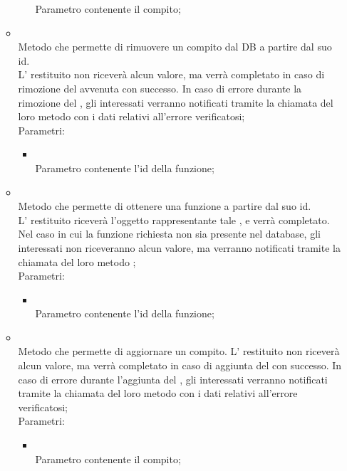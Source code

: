 \begin{itemize}
\begin{itemize}
\begin{itemize}
			Parametro contenente il compito;
		\end{itemize}
		\item[]  \\
		Metodo che permette di rimuovere un compito dal DB a partire dal suo id. \\ L' restituito non riceverà alcun valore, ma verrà completato in caso di rimozione del  avvenuta con successo. In caso di errore durante la rimozione del , gli  interessati verranno notificati tramite la chiamata del loro metodo  con i dati relativi all'errore verificatosi;\\
		Parametri:
		\begin{itemize}
			\item {} \\
			Parametro contenente l'id della funzione;
		\end{itemize}
		\item[]  \\
		Metodo che permette di ottenere una funzione a partire dal suo id. \\ L' restituito riceverà l'oggetto rappresentante tale , e verrà completato. Nel caso in cui la funzione richiesta non sia presente nel database, gli  interessati non riceveranno alcun valore, ma verranno notificati tramite la chiamata del loro metodo ;\\
		Parametri:
		\begin{itemize}
			\item {} \\
			Parametro contenente l'id della funzione;
		\end{itemize}
		\item[]  \\
		Metodo che permette di aggiornare un compito. L' restituito non riceverà alcun valore, ma verrà completato in caso di aggiunta del  con successo. In caso di errore durante l'aggiunta del , gli  interessati verranno notificati tramite la chiamata del loro metodo  con i dati relativi all'errore verificatosi;\\
		Parametri:
		\begin{itemize}
			\item {} \\
			Parametro contenente il compito;
		\end{itemize}
	\end{itemize}
\end{itemize}

